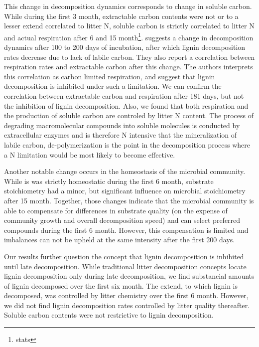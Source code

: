 \documentclass[10pt]{article}
\begin{document}
This change in decomposition dynamics corresponds to change in soluble carbon. While during the first 3 month, extractable carbon contents were not or to a lesser extend correlated to litter N, soluble carbon is strictly correlated to litter N and actual respiration after 6 and 15 month\footnote{stats}. \cite{Klotzbucher2011} suggests a change in decomposition dynamics after 100 to 200 days of incubation, after which lignin decomposition rates decrease due to lack of labile carbon. They also report a correlation between respiration rates and extractable carbon after this change. The authors interprets this correlation as carbon limited respiration, and suggest that lignin decomposition is inhibited under such a limitation. We can confirm the correlation between extractable carbon and respiration after 181 days, but not the inhibition of lignin decomposition. Also, we found that both respiration and the production of soluble carbon are controled by litter N content. The process of degrading macromolecular compounds into soluble molecules is conducted by extracellular enzymes and is therefore N intensive that the mineralization of labile carbon, de-polymerization is the point in the decomposition process where a N limitation would be most likely to become effective. 

Another notable change occurs in the homeostasis of the microbial community. While is was strictly homeostatic during the first 6 month, substrate stoichiometry had a minor, but significant influence on microbial stoichiometry after 15 month. Together, those changes indicate that the microbial community is able to compensate for differences in substrate quality (on the expense of community growth and overall decomposition speed) and can select preferred compounds during the first 6 month. However, this compensation is limited and imbalances can not be upheld at the same intensity after the first 200 days. 


Our results further question the concept that lignin decomposition is inhibited until late decomposition. While traditional litter decomposition concepts locate lignin decomposition only during late decomposition, we find substancial amounts of lignin decomposed over the first six month. The extend, to which lignin is decomposed, was controlled by litter chemistry over the first 6 month. However, we did not find lignin decomposition rates controlled by litter quality thereafter. Soluble carbon contents were not restrictive to lignin decomposition.
\end{document}
